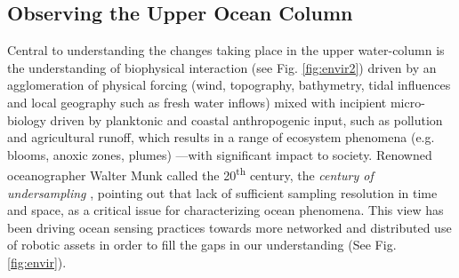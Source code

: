 \documentclass[aoas]{imsart}
\begin{document}
\subsection{Observing the Upper Ocean Column}

Central to understanding the changes taking place in the upper
water-column is the understanding of biophysical interaction (see Fig.
\ref{fig:envir2}) driven by an agglomeration of physical forcing (wind,
topography, bathymetry, tidal influences and local geography such as
fresh water inflows) mixed with incipient micro-biology driven by
planktonic and coastal anthropogenic input, such as pollution and
agricultural runoff, which results in a range of ecosystem phenomena
(e.g. blooms, anoxic zones, plumes) ---with significant impact to
society. Renowned oceanographer Walter Munk called the
20\textsuperscript{th} century, the \emph{century of undersampling}
\citep{munk2002}, pointing out that lack of sufficient sampling
resolution in time and space, %
as a critical issue for characterizing ocean phenomena. This view has
been driving ocean sensing practices towards more networked and
distributed use of robotic assets in order to fill the gaps in
our understanding (See Fig. \ref{fig:envir}).
\end{document}
